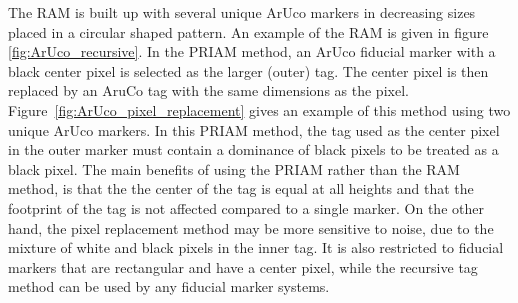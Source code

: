 The \gls{RAM} is built up with several unique ArUco markers in decreasing sizes placed in a circular shaped pattern. An example of the \gls{RAM} is given in figure \ref{fig:ArUco_recursive}. In the \gls{PRIAM} method, an ArUco fiducial marker with a black center pixel is selected as the larger (outer) tag. The center pixel is then replaced by an AruCo tag with the same dimensions as the pixel. Figure~\ref{fig:ArUco_pixel_replacement} gives an example of this method using two unique ArUco markers. In this \gls{PRIAM} method, the tag used as the center pixel in the outer marker must contain a dominance of black pixels to be treated as a black pixel. The main benefits of using the \gls{PRIAM} rather than the \gls{RAM} method, is that the the center of the tag is equal at all heights and that the footprint of the tag is not affected compared to a single marker. On the other hand, the pixel replacement method may be more sensitive to noise, due to the mixture of white and black pixels in the inner tag. It is also restricted to fiducial markers that are rectangular and have a center pixel, while the recursive tag method can be used by any fiducial marker systems. 
